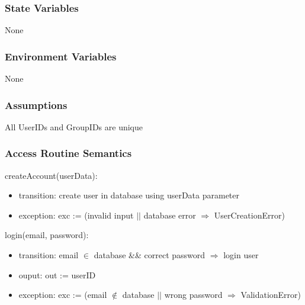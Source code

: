 \documentclass[12pt, titlepage]{article}
\begin{document}
\subsubsection{State Variables}

None


\subsubsection{Environment Variables}

None


\subsubsection{Assumptions}

All UserIDs and GroupIDs are unique


\subsubsection{Access Routine Semantics}

\noindent createAccount(userData):
\begin{itemize}
\item transition: create user in database using userData parameter
\item exception:  exc := (invalid input $\vert\vert$ database error $\Rightarrow$ UserCreationError)
\end{itemize}

\noindent login(email, password):
\begin{itemize}
\item transition: email $\in$ database \&\& correct password $\Rightarrow$ login user
\item ouput: out := userID
\item exception: exc := (email $\notin$ database $\vert\vert$ wrong password $\Rightarrow$ ValidationError)
\end{itemize}
\end{document}
